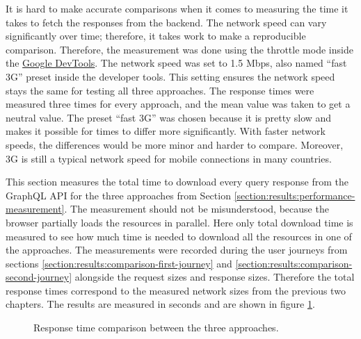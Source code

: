 It is hard to make accurate comparisons when it comes to measuring the time it takes to fetch the responses from the backend. The network speed can vary significantly over time; therefore, it takes work to make a reproducible comparison. Therefore, the measurement was done using the throttle mode inside the \href{https://developer.chrome.com/docs/devtools/}{Google DevTools}. The network speed was set to 1.5 Mbps, also named \enquote{fast 3G} preset inside the developer tools. This setting ensures the network speed stays the same for testing all three approaches. The response times were measured three times for every approach, and the mean value was taken to get a neutral value. The preset \enquote{fast 3G} was chosen because it is pretty slow and makes it possible for times to differ more significantly. With faster network speeds, the differences would be more minor and harder to compare. Moreover, 3G is still a typical network speed for mobile connections in many countries.

\bigskip

\noindent This section measures the total time to download every query response from the GraphQL \ac{API} for the three approaches from Section \ref{section:results:performance-measurement}. The measurement should not be misunderstood, because the browser partially loads the resources in parallel. Here only total download time is measured to see how much time is needed to download all the resources in one of the approaches. The measurements were recorded during the user journeys from sections \ref{section:results:comparison-first-journey} and \ref{section:results:comparison-second-journey} alongside the request sizes and response sizes. Therefore the total response times correspond to the measured network sizes from the previous two chapters. The results are measured in seconds and are shown in figure \ref{fig:discussion:response-times}. 

\begin{figure}[H]
  \centering
  \caption{Response time comparison between the three approaches.}\label{fig:discussion:response-times}
\end{figure}

